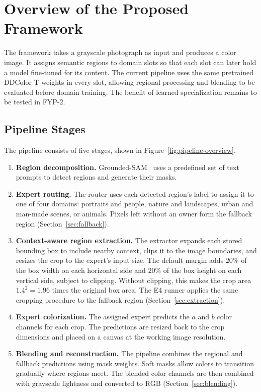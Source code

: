 \documentclass{FastFyp}
\begin{document}
\section{Overview of the Proposed Framework}
\label{sec:framework}
The framework takes a grayscale photograph as input and produces a color image. It assigns semantic regions to domain slots so that each slot can later hold a model fine-tuned for its content. The current pipeline uses the same pretrained DDColor-T weights in every slot, allowing regional processing and blending to be evaluated before domain training. The benefit of learned specialization remains to be tested in FYP-2.
\subsection{Pipeline Stages}

The pipeline consists of five stages, shown in
Figure~\ref{fig:pipeline-overview}.

\begin{enumerate}
    \item \textbf{Region decomposition.} Grounded-SAM~\cite{ref17} uses a
          predefined set of text prompts to detect regions and generate
          their masks.

    \item \textbf{Expert routing.} The router uses each detected region's
          label to assign it to one of four domains: portraits and people,
          nature and landscapes, urban and man-made scenes, or animals.
          Pixels left without an owner form the fallback region
          (Section~\ref{sec:fallback}).

    \item \textbf{Context-aware region extraction.} The extractor expands
          each stored bounding box to include nearby context, clips it to
          the image boundaries, and resizes the crop to the expert's input
          size. The default margin adds $20\%$ of the box width on each
          horizontal side and $20\%$ of the box height on each vertical
          side, subject to clipping. Without clipping, this makes the crop area $1.4^2=1.96$ times the original box area. The E4 runner applies the same
          cropping procedure to the fallback region
          (Section~\ref{sec:extraction}).

    \item \textbf{Expert colorization.} The assigned expert predicts the
          $a$ and $b$ color channels for each crop. The predictions are
          resized back to the crop dimensions and placed on a canvas at
          the working image resolution.

    \item \textbf{Blending and reconstruction.} The pipeline combines the
          regional and fallback predictions using mask weights. Soft
          masks allow colors to transition gradually where regions meet.
          The blended color channels are then combined with grayscale
          lightness and converted to RGB (Section~\ref{sec:blending}).
\end{enumerate}
\end{document}
